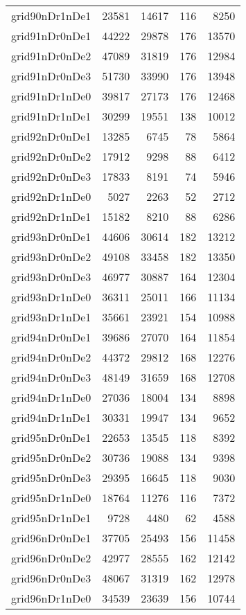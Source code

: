 \begin{longtable}{lrrrr}
grid90nDr1nDe1 & 23581 & 14617 & 116 & 8250 \\
grid91nDr0nDe1 & 44222 & 29878 & 176 & 13570 \\
grid91nDr0nDe2 & 47089 & 31819 & 176 & 12984 \\
grid91nDr0nDe3 & 51730 & 33990 & 176 & 13948 \\
grid91nDr1nDe0 & 39817 & 27173 & 176 & 12468 \\
grid91nDr1nDe1 & 30299 & 19551 & 138 & 10012 \\
grid92nDr0nDe1 & 13285 & 6745 & 78 & 5864 \\
grid92nDr0nDe2 & 17912 & 9298 & 88 & 6412 \\
grid92nDr0nDe3 & 17833 & 8191 & 74 & 5946 \\
grid92nDr1nDe0 & 5027 & 2263 & 52 & 2712 \\
grid92nDr1nDe1 & 15182 & 8210 & 88 & 6286 \\
grid93nDr0nDe1 & 44606 & 30614 & 182 & 13212 \\
grid93nDr0nDe2 & 49108 & 33458 & 182 & 13350 \\
grid93nDr0nDe3 & 46977 & 30887 & 164 & 12304 \\
grid93nDr1nDe0 & 36311 & 25011 & 166 & 11134 \\
grid93nDr1nDe1 & 35661 & 23921 & 154 & 10988 \\
grid94nDr0nDe1 & 39686 & 27070 & 164 & 11854 \\
grid94nDr0nDe2 & 44372 & 29812 & 168 & 12276 \\
grid94nDr0nDe3 & 48149 & 31659 & 168 & 12708 \\
grid94nDr1nDe0 & 27036 & 18004 & 134 & 8898 \\
grid94nDr1nDe1 & 30331 & 19947 & 134 & 9652 \\
grid95nDr0nDe1 & 22653 & 13545 & 118 & 8392 \\
grid95nDr0nDe2 & 30736 & 19088 & 134 & 9398 \\
grid95nDr0nDe3 & 29395 & 16645 & 118 & 9030 \\
grid95nDr1nDe0 & 18764 & 11276 & 116 & 7372 \\
grid95nDr1nDe1 & 9728 & 4480 & 62 & 4588 \\
grid96nDr0nDe1 & 37705 & 25493 & 156 & 11458 \\
grid96nDr0nDe2 & 42977 & 28555 & 162 & 12142 \\
grid96nDr0nDe3 & 48067 & 31319 & 162 & 12978 \\
grid96nDr1nDe0 & 34539 & 23639 & 156 & 10744 \\

\end{longtable}

